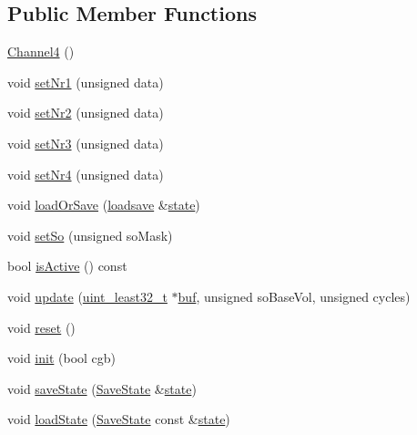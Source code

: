 \subsection*{Public Member Functions}
\begin{DoxyCompactItemize}
\item 
\hyperlink{classgambatte_1_1Channel4_a54ef50ebeae47194401f0ef3b9a42779}{Channel4} ()
\item 
void \hyperlink{classgambatte_1_1Channel4_a29c6023cb669f67015be405d9fd11e84}{set\+Nr1} (unsigned data)
\item 
void \hyperlink{classgambatte_1_1Channel4_a7a21ae3524252511625070809422112f}{set\+Nr2} (unsigned data)
\item 
void \hyperlink{classgambatte_1_1Channel4_a4c7beb366f4cd1879fbc3932b83bac1c}{set\+Nr3} (unsigned data)
\item 
void \hyperlink{classgambatte_1_1Channel4_a7c5516829899996fb0413694fb560550}{set\+Nr4} (unsigned data)
\item 
void \hyperlink{classgambatte_1_1Channel4_a795b90550082949eb375a5a242bc6137}{load\+Or\+Save} (\hyperlink{classgambatte_1_1loadsave}{loadsave} \&\hyperlink{ppu_8cpp_a2f2eca6997ee7baf8901725ae074d45b}{state})
\item 
void \hyperlink{classgambatte_1_1Channel4_aed1eb1e4bc6a1fdf30e74de63d03e46c}{set\+So} (unsigned so\+Mask)
\item 
bool \hyperlink{classgambatte_1_1Channel4_a5e0e0a8fd225f1547683f813639f8ec3}{is\+Active} () const
\item 
void \hyperlink{classgambatte_1_1Channel4_acac1c7d6828c6041f3f113275c470fb5}{update} (\hyperlink{namespacegambatte_a0639f09fccfbbd5a8e0796318768e370}{uint\+\_\+least32\+\_\+t} $\ast$\hyperlink{ioapi_8h_a8ad8a13c88886b9f623034ff88570adb}{buf}, unsigned so\+Base\+Vol, unsigned cycles)
\item 
void \hyperlink{classgambatte_1_1Channel4_aa4b407e10ce0514b5d1331655e8835cd}{reset} ()
\item 
void \hyperlink{classgambatte_1_1Channel4_ac7c73d2ecf5f29b8ead9497d593602cb}{init} (bool cgb)
\item 
void \hyperlink{classgambatte_1_1Channel4_a59e6a5fccc0b14b93cf0eceb3ba4087c}{save\+State} (\hyperlink{structgambatte_1_1SaveState}{Save\+State} \&\hyperlink{ppu_8cpp_a2f2eca6997ee7baf8901725ae074d45b}{state})
\item 
void \hyperlink{classgambatte_1_1Channel4_a43adb9436bcdd83fe0c7a607a03bde26}{load\+State} (\hyperlink{structgambatte_1_1SaveState}{Save\+State} const \&\hyperlink{ppu_8cpp_a2f2eca6997ee7baf8901725ae074d45b}{state})
\end{DoxyCompactItemize}
